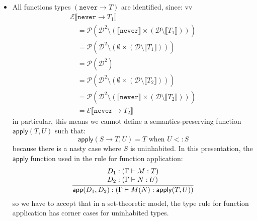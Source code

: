 \documentclass[acmsmall,review,screen]{acmart}
\makeatletter
\newcommand{\infer}[2]{\frac{\displaystyle\begin{array}{@{}l@{}}#1\end{array}}{\displaystyle#2}}
\newcommand{\NEVER}{\mathtt{never}}
\newcommand{\APPLY}{\mathsf{apply}}
\newcommand{\APP}{\mathsf{app}}
\newcommand{\fun}{\mathbin{\rightarrow}}
\newcommand{\sem}[1]{\llbracket{#1}\rrbracket}
\newcommand{\Val}{\mathcal{D}}
\makeatother
\begin{document}
\begin{itemize}
  
\item All functions types $(\NEVER \fun T)$ are identified, since:
vv  \[\begin{array}{l}
    \mathcal{E}\sem{\NEVER \fun T_1} \\\quad
     = \mathcal{P}(\Val^2 \setminus (\sem{\NEVER} \times (\Val \setminus \sem{T_1}))) \\\quad
     = \mathcal{P}(\Val^2 \setminus (\emptyset \times (\Val \setminus \sem{T_1}))) \\\quad
     = \mathcal{P}(\Val^2) \\\quad
     = \mathcal{P}(\Val^2 \setminus (\emptyset \times (\Val \setminus \sem{T_2}))) \\\quad
     = \mathcal{P}(\Val^2 \setminus (\sem{\NEVER} \times (\Val \setminus \sem{T_2}))) \\\quad
     = \mathcal{E}\sem{\NEVER \fun T_2}
  \end{array}\]
  in particular, this means we cannot define a semantics-preserving function
  $\APPLY(T, U)$ such that:
  \[
    \APPLY(S \fun T, U) = T \mbox{ when } U <: S
  \]
  because there is a nasty case where $S$ is uninhabited. In this presentation,
  the $\APPLY$ function used in the rule for function application:
  \[
    \infer{
      D_1 : (\Gamma \vdash M : T) \\
      D_2 : (\Gamma \vdash N : U)
    }{
      \APP(D_1, D_2) : (\Gamma \vdash M(N) : \APPLY(T,U))
    }
  \]
  so we have to accept that in a set-theoretic model, the type rule for function
  application has corner cases for uninhabited types.


\end{itemize}
\end{document}
